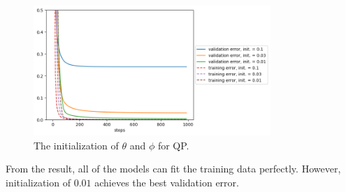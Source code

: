 \begin{answer}
    \begin{figure}[H]
        \centering
        \includegraphics[width=0.8\textwidth]{../src/implicitreg/implicitreg_quadratic_initialization.png}
        \caption{The initialization of $\theta$ and $\phi$ for QP.}
        \label{fig:qp-initialization}
    \end{figure}
    From the result, all of the models can fit the training data perfectly. However, 
    initialization of $0.01$ achieves the best validation error.
\end{answer}
